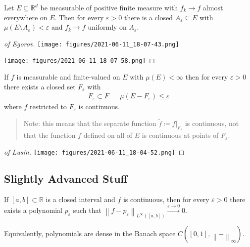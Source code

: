 \begin{theorem}

Let \(E \subseteq {\mathbb{R}}^d\) be measurable of positive finite
measure with \(f_k\to f\) almost everywhere on \(E\). Then for every
\({\varepsilon}> 0\) there is a closed \(A_{\varepsilon}\subseteq E\)
with \(\mu(E\setminus A_{\varepsilon}) < {\varepsilon}\) and
\(f_k\to f\) uniformly on \(A_{\varepsilon}\).

\end{theorem}

\begin{proof}[of Egorov]

\texttt{[image: figures/2021-06-11\_18-07-43.png]}

\texttt{[image: figures/2021-06-11\_18-07-58.png]}

\end{proof}

\begin{theorem}

If \(f\) is measurable and finite-valued on \(E\) with
\(\mu(E) < \infty\) then for every \({\varepsilon}>0\) there exists a
closed set \(F_{\varepsilon}\) with
\begin{align*}
F_{\varepsilon}\subset F && \mu(E - F_{\varepsilon}) \leq {\varepsilon}
\end{align*}
where \(f\) restricted to \(F_{\varepsilon}\) is continuous.

\begin{quote}
Note: this means that the separate function
\(\tilde f \coloneqq{ \left.{{f}} \right|_{{F_{\varepsilon}}} }\) is
continuous, not that the function \(f\) defined on all of \(E\) is
continuous at points of \(F_{\varepsilon}\).
\end{quote}

\end{theorem}

\begin{proof}[of Lusin]

\texttt{[image: figures/2021-06-11\_18-04-52.png]}

\end{proof}

\hypertarget{slightly-advanced-stuff}{%
\subsection{Slightly Advanced Stuff}\label{slightly-advanced-stuff}}

\begin{theorem}

If \([a, b] \subset {\mathbb{R}}\) is a closed interval and \(f\) is
continuous, then for every \({\varepsilon}> 0\) there exists a
polynomial \(p_{\varepsilon}\) such that
\({\left\lVert {f- p_{\varepsilon}} \right\rVert}_{L^\infty([a, b])} \overset{{\varepsilon}\to 0}\to 0\).

Equivalently, polynomials are dense in the Banach space
\(C([0, 1], {\left\lVert {{-}} \right\rVert}_\infty)\).

\end{theorem}

